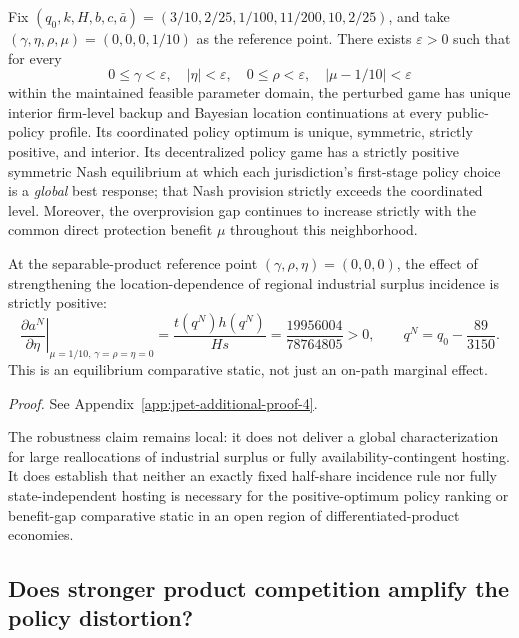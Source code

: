 \begin{proposition}
\label{prop:incidence-robustness}
Fix $(q_0,k,H,b,c,\bar a)=(3/10,2/25,1/100,11/200,10,2/25)$,
and take $(\gamma,\eta,\rho,\mu)=(0,0,0,1/10)$
as the reference point.
There exists $\varepsilon>0$ such that for every
\[
0\le\gamma<\varepsilon,\quad
|\eta|<\varepsilon,\quad
0\le\rho<\varepsilon,\quad
|\mu-1/10|<\varepsilon
\]
within the maintained feasible parameter domain, the
perturbed game has unique interior firm-level backup and
Bayesian location continuations at every public-policy profile.
Its coordinated policy optimum is unique, symmetric, strictly
positive, and interior. Its decentralized policy game has a
strictly positive symmetric Nash equilibrium at which each
jurisdiction's first-stage policy choice is a \emph{global}
best response; that Nash provision strictly exceeds the
coordinated level. Moreover, the overprovision gap continues
to increase strictly with the common direct protection benefit
$\mu$ throughout this neighborhood.

At the separable-product reference point
$(\gamma,\rho,\eta)=(0,0,0)$, the effect of strengthening
the location-dependence of regional industrial surplus incidence
is strictly positive:
\begin{equation}
\left.
\frac{\partial a^N}{\partial\eta}
\right|_{\mu=1/10,\,\gamma=\rho=\eta=0}
=\frac{t(q^N)h(q^N)}{H s}
=\frac{19956004}{78764805}>0,
\qquad q^N=q_0-\frac{89}{3150}.
\label{eq:incidence-response}
\end{equation}
This is an equilibrium comparative static, not just an
on-path marginal effect.
\end{proposition}

\noindent\emph{Proof.} See Appendix~\ref{app:jpet-additional-proof-4}.

The robustness claim remains local: it does not deliver
a global characterization for large reallocations of
industrial surplus or fully availability-contingent hosting.
It does establish that neither an exactly fixed half-share
incidence rule nor fully state-independent hosting is
necessary for the positive-optimum policy ranking or
benefit-gap comparative static in an open region of
differentiated-product economies.


\subsection{Does stronger product competition amplify the policy distortion?}
\label{sec:product-market-amplification}

